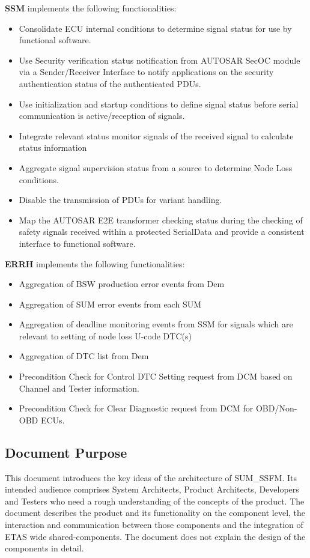 \textbf{SSM} implements the following functionalities:
\begin{itemize}
	\item Consolidate ECU internal conditions to determine signal status for use by functional software.
	\item Use Security verification status notification from AUTOSAR SecOC module via a Sender/Receiver Interface to notify applications on the security authentication status of the authenticated PDUs.
	\item Use initialization and startup conditions to define signal status before serial communication is active/reception of signals.
	\item Integrate relevant status monitor signals of the received signal to calculate status information
	\item Aggregate signal supervision status from a source to determine Node Loss conditions.
	\item Disable the transmission of PDUs for variant handling.
	\item Map the AUTOSAR E2E transformer checking status during the checking of safety signals received within a protected SerialData and provide a consistent interface to functional software.
\end{itemize}

\textbf{ERRH} implements the following functionalities:
\begin{itemize}
	\item Aggregation of BSW production error events from Dem
	\item Aggregation of SUM error events from each SUM
	\item Aggregation of deadline monitoring events from SSM for signals which are relevant to setting of node loss U-code DTC(s)
	\item Aggregation of DTC list from Dem
	\item Precondition Check for Control DTC Setting request from DCM based on Channel and Tester information.
	\item Precondition Check for Clear Diagnostic request from DCM for OBD/Non-OBD ECUs.
\end{itemize}

\subsection{Document Purpose}

This document introduces the key ideas of the architecture of SUM\_SSFM.
Its intended audience comprises System Architects, Product Architects, Developers and Testers who need a rough understanding of the concepts of the product.
The document describes the product and its functionality on the component level, the interaction and communication between those components and the integration of ETAS wide shared-components.
The document does not explain the design of the components in detail.


